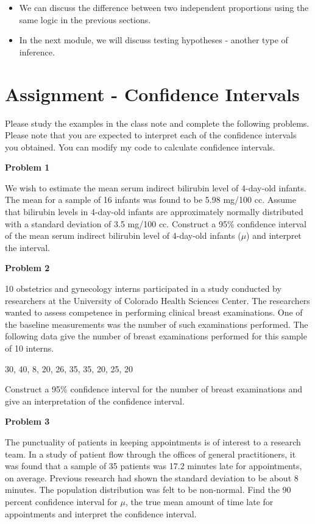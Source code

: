 \documentclass[
]{book}
\begin{document}
\begin{itemize}
\item
  We can discuss the difference between two independent proportions using the same logic in the previous sections.
\item
  In the next module, we will discuss testing hypotheses - another type of inference.
\end{itemize}

\hypertarget{assignment---confidence-intervals}{%
\section{Assignment - Confidence Intervals}\label{assignment---confidence-intervals}}

Please study the examples in the class note and complete the following problems. Please note that you are expected to interpret each of the confidence intervals you obtained. You can modify my code to calculate confidence intervals.

\textbf{Problem 1}

We wish to estimate the mean serum indirect bilirubin level of 4-day-old infants. The mean for a
sample of 16 infants was found to be 5.98 mg/100 cc. Assume that bilirubin levels in 4-day-old infants
are approximately normally distributed with a standard deviation of 3.5 mg/100 cc. Construct a 95\% confidence interval of the mean serum indirect bilirubin level of 4-day-old infants (\(\mu\)) and interpret the interval.

\textbf{Problem 2}

10 obstetrics and gynecology interns participated in a study conducted by researchers at the University of Colorado Health Sciences Center. The researchers wanted to assess competence in performing clinical breast examinations. One of the baseline measurements was the number of such examinations performed. The following data give the number of breast examinations performed for this sample of 10 interns.

30, 40, 8, 20, 26, 35, 35, 20, 25, 20

Construct a 95\% confidence interval for the number of breast examinations and give an interpretation of the confidence interval.

\textbf{Problem 3}

The punctuality of patients in keeping appointments is of interest to a research team. In a study of patient flow through the offices of general practitioners, it was found that a sample of 35 patients was 17.2 minutes late for appointments, on average. Previous research had shown the standard deviation to be about 8 minutes. The population distribution was felt to be non-normal. Find the 90 percent confidence interval for \(\mu\), the true mean amount of time late for appointments and interpret the confidence interval.
\end{document}
